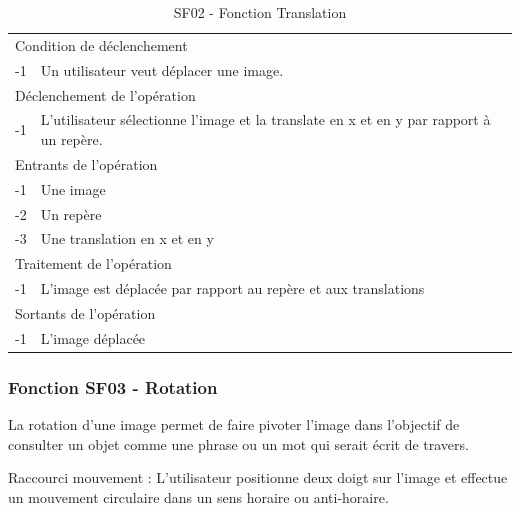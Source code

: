 \documentclass[a4paper]{article}
\begin{document}
\begin{table}[H]
  \centering
   \small
	\begin{tabular}{|c|p{12cm}|}
   		\hline
   			\rowcolor{lightgray}\multicolumn{2}{|c|}{\textbf{SF02 - Fonction Translation}} \\
   		\hline
   			\multicolumn{2}{|l|}{Condition de d\'eclenchement} \\
   		\hline
   			-1 & Un utilisateur veut déplacer une image. \\
   		\hline
   			\multicolumn{2}{|l|}{D\'eclenchement de l'op\'eration} \\
   		\hline
   			-1 & L'utilisateur sélectionne l'image et la translate en x et en y par rapport à un repère. \\
   		\hline
   			\multicolumn{2}{|l|}{Entrants de l'op\'eration} \\
   		\hline
        	-1 & Une image \\
   			-2 & Un repère \\
        	-3 & Une translation en x et en y \\ 	
        \hline
   			\multicolumn{2}{|l|}{Traitement de l'op\'eration} \\
  		\hline
   			-1 & L'image est déplacée par rapport au repère et aux translations \\
   		\hline
   			\multicolumn{2}{|l|}{Sortants de l'op\'eration} \\
   		\hline
   			-1 & L'image déplacée \\
   		\hline
	\end{tabular}
  \caption{SF02 - Fonction Translation}
  \normalsize
  \label{tab:visu_img_translation}
\end{table}

\subsubsection{Fonction SF03 - Rotation}

La rotation d'une image permet de faire pivoter l'image dans l'objectif de consulter un objet comme une phrase ou un mot qui serait écrit de travers.

Raccourci mouvement : L'utilisateur positionne deux doigt sur l'image et effectue un mouvement circulaire dans un sens horaire ou anti-horaire.
\end{document}

